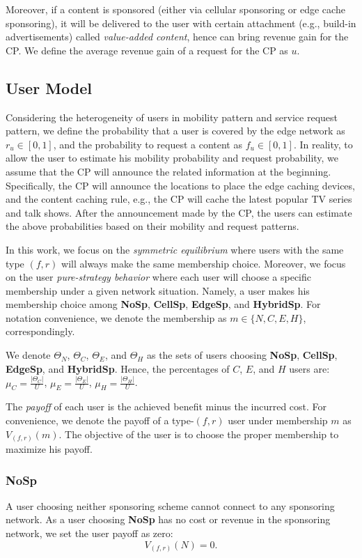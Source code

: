 Moreover, if a content is sponsored (either via cellular sponsoring or edge cache sponsoring), it will be delivered to the user with certain attachment (e.g., build-in advertisements) called \emph{value-added content}, hence can bring revenue gain for the CP. We define the average revenue gain of a request for the CP as $u$.

\subsection{User Model}
Considering the heterogeneity of users in mobility pattern and service request pattern, we define the probability that a user is covered by the edge network as $r_u \in [0,1]$, and the probability to request a content as $f_u \in [0,1]$. In reality, to allow the user to estimate his mobility probability and request probability, we assume that the CP will announce the related information at the beginning. Specifically, the CP will announce the locations to place the edge caching devices, and the content caching rule, e.g., the CP will cache the latest popular TV series and talk shows. After the announcement made by the CP, the users can estimate the above probabilities based on their mobility and request patterns.

In this work, we focus on the \emph{symmetric equilibrium} where users with the same type $(f, r)$ will always make the same membership choice. Moreover, we focus on the user \emph{pure-strategy behavior} where each user will choose a specific membership under a given network situation. Namely, a user makes his membership choice among \textbf{NoSp}, \textbf{CellSp}, \textbf{EdgeSp}, and \textbf{HybridSp}. For notation convenience, we denote the membership as $m \in \{N, C, E, H\}$, correspondingly.

We denote $\Theta_N$, $\Theta_C$, $\Theta_E$, and $\Theta_H$ as the sets of users choosing \textbf{NoSp}, \textbf{CellSp}, \textbf{EdgeSp}, and \textbf{HybridSp}. Hence, the percentages of $C$, $E$, and $H$ users are: $\mu_C=\frac{|\Theta_C|}{U}$, $\mu_E=\frac{|\Theta_E|}{U}$, $\mu_H=\frac{|\Theta_H|}{U}$.

 The \emph{payoff} of each user is the achieved benefit minus the incurred cost. For convenience, we denote the payoff of a type-$(f, r)$ user under membership $m$ as $V_{(f, r)}(m)$. The objective of the user is to choose the proper membership to maximize his payoff.

 \subsubsection{\textbf{NoSp}}
 A user choosing neither sponsoring scheme cannot connect to any sponsoring network. As a user choosing \textbf{NoSp} has no cost or revenue in the sponsoring network, we set the user payoff as zero: \begin{equation}V_{(f, r)}(N)=0.\end{equation}
	
